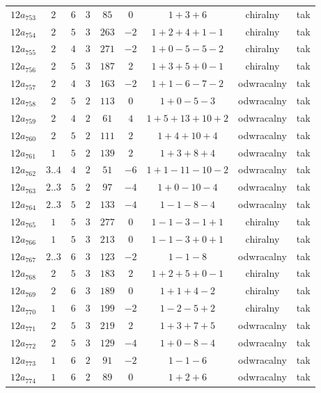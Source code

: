 \begin{longtable}{ccccccccc}
$12a_{753}$ & $2$ & $6$ & $3$ & $85$ & $0$ & $1+3+6$ & chiralny & tak \\
$12a_{754}$ & $2$ & $5$ & $3$ & $263$ & $-2$ & $1+2+4+1-1$ & chiralny & tak \\
$12a_{755}$ & $2$ & $4$ & $3$ & $271$ & $-2$ & $1+0-5-5-2$ & chiralny & tak \\
$12a_{756}$ & $2$ & $5$ & $3$ & $187$ & $2$ & $1+3+5+0-1$ & chiralny & tak \\
$12a_{757}$ & $2$ & $4$ & $3$ & $163$ & $-2$ & $1+1-6-7-2$ & odwracalny & tak \\
$12a_{758}$ & $2$ & $5$ & $2$ & $113$ & $0$ & $1+0-5-3$ & odwracalny & tak \\
$12a_{759}$ & $2$ & $4$ & $2$ & $61$ & $4$ & $1+5+13+10+2$ & odwracalny & tak \\
$12a_{760}$ & $2$ & $5$ & $2$ & $111$ & $2$ & $1+4+10+4$ & odwracalny & tak \\
$12a_{761}$ & $1$ & $5$ & $2$ & $139$ & $2$ & $1+3+8+4$ & odwracalny & tak \\
$12a_{762}$ & $3..4$ & $4$ & $2$ & $51$ & $-6$ & $1+1-11-10-2$ & odwracalny & tak \\
$12a_{763}$ & $2..3$ & $5$ & $2$ & $97$ & $-4$ & $1+0-10-4$ & odwracalny & tak \\
$12a_{764}$ & $2..3$ & $5$ & $2$ & $133$ & $-4$ & $1-1-8-4$ & odwracalny & tak \\
$12a_{765}$ & $1$ & $5$ & $3$ & $277$ & $0$ & $1-1-3-1+1$ & chiralny & tak \\
$12a_{766}$ & $1$ & $5$ & $3$ & $213$ & $0$ & $1-1-3+0+1$ & chiralny & tak \\
$12a_{767}$ & $2..3$ & $6$ & $3$ & $123$ & $-2$ & $1-1-8$ & odwracalny & tak \\
$12a_{768}$ & $2$ & $5$ & $3$ & $183$ & $2$ & $1+2+5+0-1$ & chiralny & tak \\
$12a_{769}$ & $2$ & $6$ & $3$ & $189$ & $0$ & $1+1+4-2$ & chiralny & tak \\
$12a_{770}$ & $1$ & $6$ & $3$ & $199$ & $-2$ & $1-2-5+2$ & chiralny & tak \\
$12a_{771}$ & $2$ & $5$ & $3$ & $219$ & $2$ & $1+3+7+5$ & odwracalny & tak \\
$12a_{772}$ & $2$ & $5$ & $3$ & $129$ & $-4$ & $1+0-8-4$ & odwracalny & tak \\
$12a_{773}$ & $1$ & $6$ & $2$ & $91$ & $-2$ & $1-1-6$ & odwracalny & tak \\
$12a_{774}$ & $1$ & $6$ & $2$ & $89$ & $0$ & $1+2+6$ & odwracalny & tak \\

\end{longtable}
